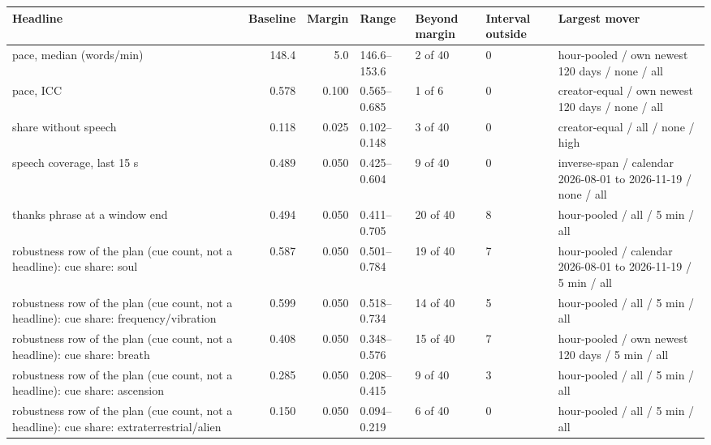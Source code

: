 {\scriptsize\setlength{\tabcolsep}{2.5pt}
\begin{tabular}{@{}p{}rrlllp{}@{}}
\toprule
Headline & Baseline & Margin & Range & Beyond margin & Interval outside & Largest mover \\
\midrule
pace, median (words/min) & 148.4 & 5.0 & 146.6--153.6 & 2 of 40 & 0 & hour-pooled / own newest 120 days / none / all \\
pace, ICC & 0.578 & 0.100 & 0.565--0.685 & 1 of 6 & 0 & creator-equal / own newest 120 days / none / all \\
share without speech & 0.118 & 0.025 & 0.102--0.148 & 3 of 40 & 0 & creator-equal / all / none / high \\
speech coverage, last 15 s & 0.489 & 0.050 & 0.425--0.604 & 9 of 40 & 0 & inverse-span / calendar 2026-08-01 to 2026-11-19 / none / all \\
thanks phrase at a window end & 0.494 & 0.050 & 0.411--0.705 & 20 of 40 & 8 & hour-pooled / all / 5 min / all \\
robustness row of the plan (cue count, not a headline): cue share: soul & 0.587 & 0.050 & 0.501--0.784 & 19 of 40 & 7 & hour-pooled / calendar 2026-08-01 to 2026-11-19 / 5 min / all \\
robustness row of the plan (cue count, not a headline): cue share: frequency/vibration & 0.599 & 0.050 & 0.518--0.734 & 14 of 40 & 5 & hour-pooled / all / 5 min / all \\
robustness row of the plan (cue count, not a headline): cue share: breath & 0.408 & 0.050 & 0.348--0.576 & 15 of 40 & 7 & hour-pooled / own newest 120 days / 5 min / all \\
robustness row of the plan (cue count, not a headline): cue share: ascension & 0.285 & 0.050 & 0.208--0.415 & 9 of 40 & 3 & hour-pooled / all / 5 min / all \\
robustness row of the plan (cue count, not a headline): cue share: extraterrestrial/alien & 0.150 & 0.050 & 0.094--0.219 & 6 of 40 & 0 & hour-pooled / all / 5 min / all \\
\bottomrule
\end{tabular}}
